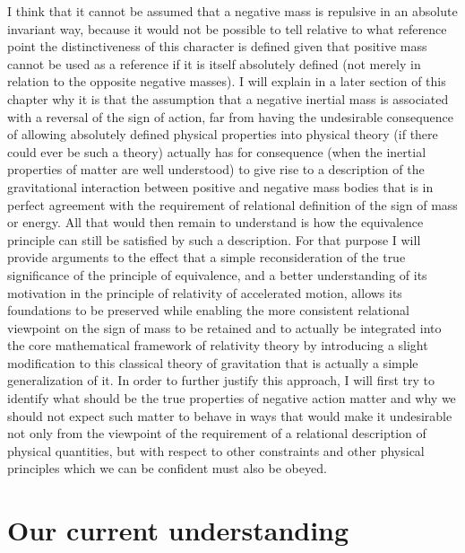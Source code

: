 \documentclass[notitlepage,12pt]{report}
\begin{document}
I think that it cannot be assumed that a negative mass is repulsive in an absolute invariant way, because it would not be possible to tell relative to what reference point the distinctiveness of this character is defined given that positive mass cannot be used as a reference if it is itself absolutely defined (not merely in relation to the opposite negative masses). I will explain in a later section of this chapter why it is that the assumption that a negative inertial mass is associated with a reversal of the sign of action, far from having the undesirable consequence of allowing absolutely defined physical properties into physical theory (if there could ever be such a theory) actually has for consequence (when the inertial properties of matter are well understood) to give rise to a description of the gravitational interaction between positive and negative mass bodies that is in perfect agreement with the requirement of relational definition of the sign of mass or energy. All that would then remain to understand is how the equivalence principle can still be satisfied by such a description. For that purpose I will provide arguments to the effect that a simple reconsideration of the true significance of the principle of equivalence, and a better understanding of its motivation in the principle of relativity of accelerated motion, allows its foundations to be preserved while enabling the more consistent relational viewpoint on the sign of mass to be retained and to actually be integrated into the core mathematical framework of relativity theory by introducing a slight modification to this classical theory of gravitation that is actually a simple generalization of it. In order to further justify this approach, I will first try to identify what should be the true properties of negative action matter and why we should not expect such matter to behave in ways that would make it undesirable not only from the viewpoint of the requirement of a relational description of physical quantities, but with respect to other constraints and other physical principles which we can be confident must also be obeyed.

\section{Our current understanding}
\end{document}
